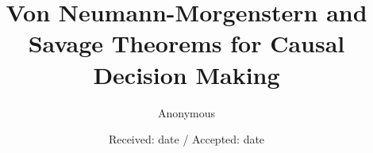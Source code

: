 \documentclass{svjour3}                     %
\begin{document}
\title{Von Neumann-Morgenstern and Savage Theorems for Causal Decision Making}

%
\author{Anonymous}


\date{Received: date / Accepted: date}
\end{document}
